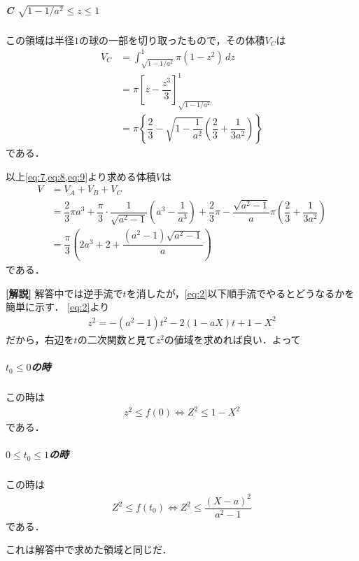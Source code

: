 \documentclass[../../main.tex]{subfiles}
\begin{document}
\subparagraph{C $\sqrt{1-1/a^2}\le z\le1$}

この領域は半径$1$の球の一部を切り取ったもので，その体積$V_C$は
\begin{align}
  V_C
  &=\int_{\sqrt{1-1/a^2}}^1\pi(1-z^2)\,dz \\
  &=\pi\left[z-\dfrac{z^3}{3}\right]_{\sqrt{1-1/a^2}}^1 \\
  &=\pi\left\{\dfrac{2}{3}-\sqrt{1-\dfrac{1}{a^2}}\left(\dfrac{2}{3}+\dfrac{1}{3a^2}\right)\right\} \label{eq:9}
\end{align}
である．
\casesend

以上\cref{eq:7,eq:8,eq:9}より求める体積$V$は
\begin{align}
  V
  &=V_A+V_B+V_C \\
  &=\dfrac{2}{3}\pi a^3+\dfrac{\pi}{3}\cdot\dfrac{1}{\sqrt{a^2-1}}\left(a^3-\dfrac{1}{a^3}\right)+\dfrac{2}{3}\pi-\dfrac{\sqrt{a^2-1}}{a}\pi\left(\dfrac{2}{3}+\dfrac{1}{3a^2}\right) \\
  &=\dfrac{\pi}{3}\left(2a^3+2+\dfrac{(a^2-1)\sqrt{a^2-1}}{a}\right)
\end{align}
である．

{\bf [解説]}
解答中では逆手流で$t$を消したが，\cref{eq:2}以下順手流でやるとどうなるかを簡単に示す．
\cref{eq:2}より
\begin{align}
  z^2 = -(a^2-1)t^2-2(1-aX)t+1-X^2
\end{align}
だから，右辺を$t$の二次関数と見て$z^2$の値域を求めれば良い．よって

\subparagraph{$t_0\le 0$の時}
この時は
\begin{align}
  z^2 \le f(0) \iff Z^2 \le 1-X^2
\end{align}
である．

\subparagraph{$0 \le t_0 \le 1$の時}

この時は
\begin{align}
  Z^2 \le f\left(t_0\right) \iff Z^2 \le \dfrac{(X-a)^2}{a^2-1}
\end{align}
である．
\casesend

これは解答中で求めた領域と同じだ．

\newpage
\end{document}
